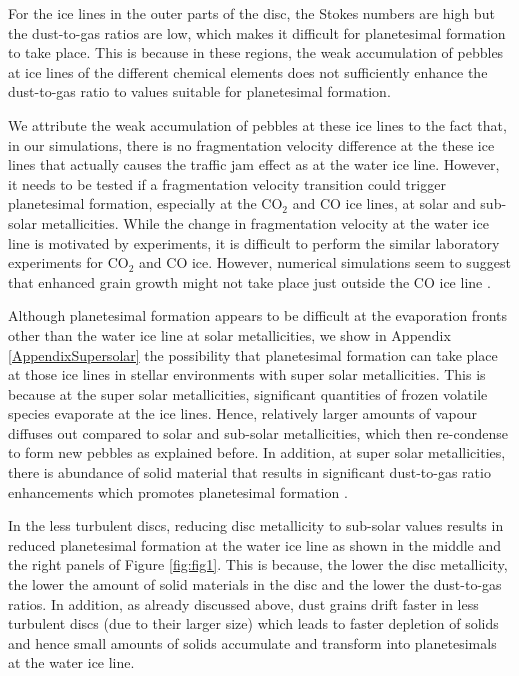 \documentclass{aa}
\begin{document}
For the ice lines in the outer parts of the disc, the Stokes numbers are high but the dust-to-gas ratios are low, which makes it difficult for planetesimal formation to take place. This is because in these regions, the weak accumulation of pebbles at ice lines of the different chemical elements does not sufficiently enhance the dust-to-gas ratio to values suitable for planetesimal formation. 

We attribute the weak accumulation of pebbles at these ice lines to the fact that, in our simulations, there is no fragmentation velocity difference at the these ice lines that actually causes the traffic jam effect as at the water ice line. However, it needs to be tested if a fragmentation velocity transition could trigger planetesimal formation, especially at the CO$_2$ and CO ice lines, at solar and sub-solar metallicities. While the change in fragmentation velocity at the water ice line is motivated by experiments, it is difficult to perform the similar laboratory experiments for CO$_2$ and CO ice. However, numerical simulations seem to suggest that enhanced grain growth might not take place just outside the CO ice line \citep{Stammler2017}.

Although planetesimal formation appears to be difficult at the evaporation fronts other than the water ice line at solar metallicities, we show in Appendix \ref{AppendixSupersolar} the possibility that planetesimal formation  can take place at those ice lines in stellar environments with super solar metallicities. This is because at the super solar metallicities, significant quantities of frozen volatile species evaporate at the ice lines.  Hence, relatively larger amounts of vapour diffuses out compared to solar and sub-solar metallicities, which then re-condense to form new pebbles as explained before. In addition, at super solar metallicities, there is abundance of solid material that results in significant dust-to-gas ratio enhancements which promotes planetesimal formation \citep[e.g.,][]{LiYoudin2021}.

In the less turbulent discs, reducing disc metallicity to sub-solar values results in reduced planetesimal formation at the water ice line as shown in the middle and the right panels of Figure \ref{fig:fig1}. This is because, the lower the disc metallicity, the lower the amount of solid materials in the disc and the lower the dust-to-gas ratios. In addition, as already discussed above, dust grains drift faster in less turbulent discs (due to their larger size) which leads to faster depletion of solids and hence small amounts of solids accumulate and transform into planetesimals at the water ice line.
\end{document}
